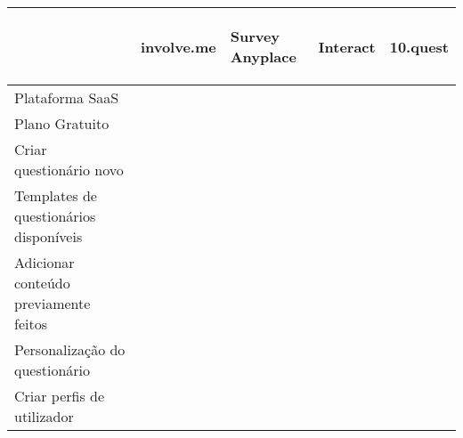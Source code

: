 \renewcommand{\arraystretch}{2}
\setlength\arrayrulewidth{1pt}
\begin{table}[!ht]  
	\begin{center}
		\begin{tabular}{|p{4cm}|p{0.1cm}|p{0.1cm}|p{0.1cm}|p{0.1cm}|}
			\cline{2-5}
			\multicolumn{1}{c|}{} & \hspace{0.2cm}\begin{sideways}involve.me\end{sideways} & \hspace{0.4cm}\begin{sideways}Survey Anyplace\end{sideways} & \hspace{0.2cm}\begin{sideways}Interact\end{sideways} &\hspace{0.2cm}\begin{sideways} 10.quest\end{sideways}\\ \hline
			
			
			Plataforma SaaS  &\cellcolor{green!80}  & \cellcolor{green!80} & \cellcolor{green!80} & \cellcolor{green!80}  \\ \hline
			
			Plano Gratuito & \cellcolor{yellow!80}   & \cellcolor{red!80}  & \cellcolor{red!80} & \cellcolor{yellow!80}  \\ \hline
			
			Criar questionário novo & \cellcolor{green!80}  & \cellcolor{green!80}  & \cellcolor{green!80} & \cellcolor{green!80} \\ \hline
			
			Templates de questionários disponíveis& \cellcolor{green!80}  & \cellcolor{green!80} & \cellcolor{green!80} & \cellcolor{red!80}  \\ \hline
			
			Adicionar conteúdo previamente feitos & \cellcolor{red!80}   & \cellcolor{red!80}  & \cellcolor{red!80} & \cellcolor{green!80}  \\ \hline
			
			Personalização do questionário & \cellcolor{green!80}  & \cellcolor{green!80}  & \cellcolor{green!80} & \cellcolor{green!80} \\ \hline
		
			
			Criar perfis de utilizador & \cellcolor{red!80}   & \cellcolor{red!80}  & \cellcolor{red!80} & \cellcolor{green!80}  \\ \hline
			

\end{tabular}
\end{center}
\end{table}
